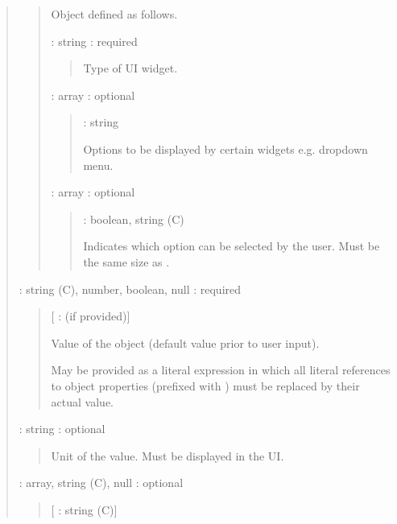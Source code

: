 \documentclass[letterpaper,10pt, openany,english]{sphinxmanual}
\begin{document}
\begin{quote}
\begin{quote}
Object defined as follows.

 : string : required
\begin{quote}

Type of UI widget.
\end{quote}

 : array : optional
\begin{quote}

 : string

Options to be displayed by certain widgets e.g. dropdown menu.
\end{quote}

 : array : optional
\begin{quote}

 : boolean, string (C)

Indicates which option can be selected by the user. Must be the same size as .
\end{quote}
\end{quote}

 : string (C), number, boolean, null : required
\begin{quote}

{[} :  (if provided){]}

\begin{DUlineblock}{0em}
\item[] Value of the object (default value prior to user input).
\item[] May be provided as a literal expression in which all literal references to object properties (prefixed with \sphinxcode{\sphinxupquote{\#}}) must be replaced by their actual value.
\end{DUlineblock}
\end{quote}

 : string : optional
\begin{quote}

Unit of the value. Must be displayed in the UI.
\end{quote}

 : array, string (C), null : optional
\begin{quote}

{[} : string (C){]}


\end{quote}
\end{quote}
\end{document}
